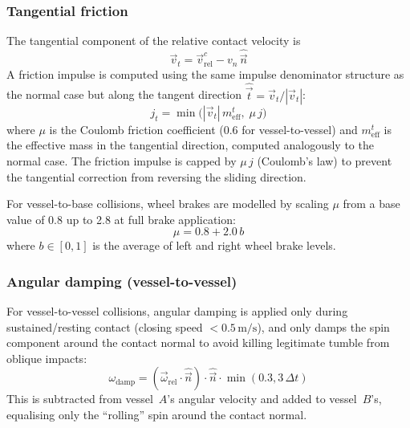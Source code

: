 \documentclass[Orbiter Technical Reference.tex]{subfiles}
\begin{document}
\subsubsection{Tangential friction}
\label{sssec:friction}
The tangential component of the relative contact velocity is
\begin{equation*}
\vec{v}_t = \vec{v}_{\mathrm{rel}}^c - v_n\,\hat{\vec{n}}
\end{equation*}
A friction impulse is computed using the same impulse denominator structure
as the normal case but along the tangent direction
$\hat{\vec{t}} = \vec{v}_t / |\vec{v}_t|$:
\begin{equation}
j_t = \min\!\bigl(|\vec{v}_t|\,m_{\mathrm{eff}}^t,\;\mu\,j\bigr)
\label{eq:friction}
\end{equation}
where $\mu$ is the Coulomb friction coefficient (0.6 for vessel-to-vessel)
and $m_{\mathrm{eff}}^t$ is the effective mass in the tangential direction,
computed analogously to the normal case.
The friction impulse is capped by $\mu\,j$ (Coulomb's law) to prevent
the tangential correction from reversing the sliding direction.

For vessel-to-base collisions, wheel brakes are modelled by scaling $\mu$
from a base value of 0.8 up to 2.8 at full brake application:
\begin{equation*}
\mu = 0.8 + 2.0\,b
\end{equation*}
where $b \in [0,1]$ is the average of left and right wheel brake levels.

\subsubsection{Angular damping (vessel-to-vessel)}
\label{sssec:angdamp}
For vessel-to-vessel collisions, angular damping is applied only during
sustained/resting contact (closing speed $< 0.5\,\text{m/s}$), and only
damps the spin component around the contact normal to avoid killing
legitimate tumble from oblique impacts:
\begin{equation*}
\omega_{\mathrm{damp}} = (\vec{\omega}_{\mathrm{rel}} \cdot \hat{\vec{n}}) \cdot \hat{\vec{n}} \cdot \min(0.3, 3\,\Delta t)
\end{equation*}
This is subtracted from vessel~$A$'s angular velocity and added to vessel~$B$'s,
equalising only the ``rolling'' spin around the contact normal.
\end{document}
